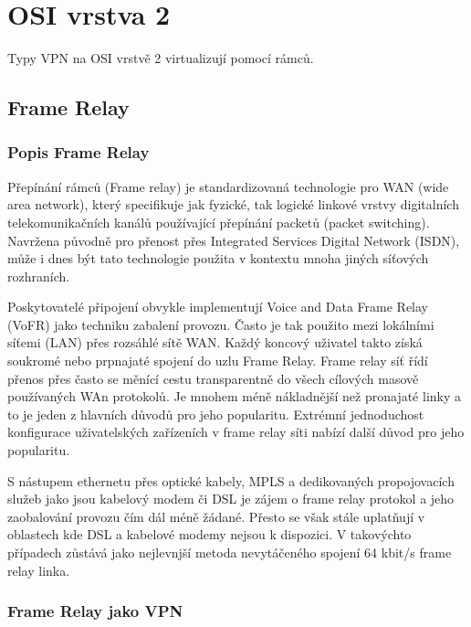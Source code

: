 \documentclass[thesis=B,czech]{FITthesis}[2012/06/26]
\begin{document}
  \section{OSI vrstva 2}

	Typy VPN na OSI vrstvě 2 virtualizují pomocí rámců.

    \subsection{Frame Relay}

      \subsubsection{Popis Frame Relay}

        Přepínání rámců (Frame relay) je standardizovaná technologie pro WAN (wide area network), který specifikuje jak fyzické, tak logické linkové vrstvy digitalních telekomunikačních kanálů používající přepínání packetů (packet switching). Navržena původně pro přenost přes Integrated Services Digital Network (ISDN), může i dnes být tato technologie použita v kontextu mnoha jiných síťových rozhraních.

        Poskytovatelé připojení obvykle implementují Voice and Data Frame Relay (VoFR) jako techniku zabalení provozu. Často je tak  použito mezi lokálními síťemi (LAN) přes rozsáhlé sítě WAN. Každý koncový uživatel takto získá soukromé nebo prpnajaté spojení do uzlu Frame Relay. Frame relay síť řídí přenos přes často se měnící cestu transparentně do všech cílových masově používaných WAn protokolů. Je mnohem méně nákladnější než pronajaté linky a to je jeden z hlavních důvodů pro jeho popularitu. Extrémní jednoduchost konfigurace uživatelských zařízeních v frame relay síti nabízí další důvod pro jeho popularitu.

        S nástupem ethernetu přes optické kabely, MPLS a dedikovaných propojovacích služeb jako jsou kabelový modem či DSL je zájem o frame relay protokol a jeho zaobalování provozu čím dál méně žádané. Přesto se však stále uplatňují v oblastech kde DSL a kabelové modemy nejsou k dispozici. V takovýchto případech zůstává jako nejlevnjší metoda nevytáčeného spojení 64 kbit/s frame relay linka. \cite{frame_relay_basics}

      \subsubsection{Frame Relay jako VPN}
\end{document}
